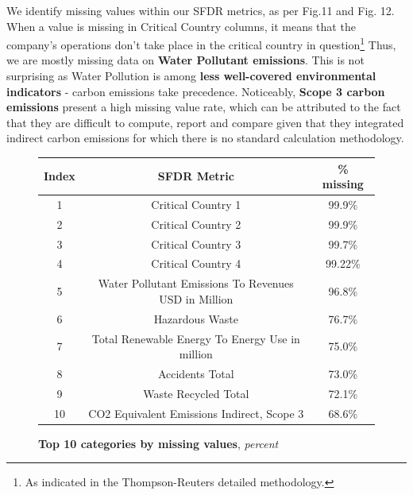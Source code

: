 \documentclass[12pt]{report}
\begin{document}
We identify missing values within our SFDR metrics, as per Fig.11 and Fig. 12.
When a value is missing in Critical Country columns, it means that the company's operations don't take place in the critical country in question\footnote{As indicated in the Thompson-Reuters detailed methodology.}\newline
Thus, we are mostly missing data on \textbf{Water Pollutant emissions}. This is not surprising as Water Pollution is among \textbf{less well-covered environmental indicators} - carbon emissions take precedence. Noticeably, \textbf{Scope 3 carbon emissions} present a high missing value rate, which can be attributed to the fact that they are difficult to compute, report and compare given that they integrated indirect carbon emissions for which there is no standard calculation methodology. 
\begin{figure}[h!]
\begin{center}
\begin{tabular}{ |c|c|c| }
\hline
 Index & SFDR Metric & \% missing \\
 \hline\hline
 1 & Critical Country 1 & 99.9\% \\  
 2 & Critical Country 2 & 99.9\% \\
 3 & Critical Country 3 & 99.7\% \\
 4 & Critical Country 4 & 99.22\% \\
 5 & Water Pollutant Emissions To Revenues USD in Million & 96.8\% \\
 6 & Hazardous Waste & 76.7\% \\
 7 & Total Renewable Energy To Energy Use in million & 75.0\% \\
 8 & Accidents Total & 73.0\% \\
 9 & Waste Recycled Total & 72.1\% \\
 10 & CO2 Equivalent Emissions Indirect, Scope 3 & 68.6\% \\

\hline
\end{tabular}
\end{center}
\caption{\textbf{Top 10 categories by missing values}, \textit{percent}}
\label{fig:top10missing}
\end{figure}
\end{document}

